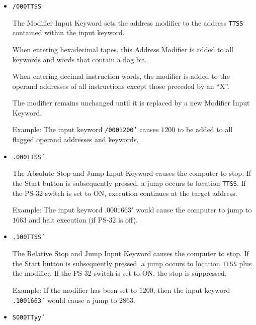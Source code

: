 \begin{itemize}
Example: The input keyword \texttt{V40C1100'} causes the following 64 (40 hex) hexadecimal words to be stored, beginning in memory location $1700$.

When reading hexadecimal tapes with \texttt{V} or \texttt{M} keywords, the Program Input Routine verifies each stored word; specifically, after a word is stored, the value in memory is compared with the read-in value. If the two values do not match, an error stop occurs.


\item \texttt{/000TTSS}

The Modifier Input Keyword sets the address modifier to the address \texttt{TTSS} contained within the input keyword.

When entering hexadecimal tapes, this Address Modifier is added to all keywords and words that contain a flag bit.

When entering decimal instruction words, the modifier is added to the operand addresses of all instructions except those preceded by an ``X''.

The modifier remains unchanged until it is replaced by a new Modifier Input Keyword.

Example: The input keyword \texttt{/0001200'} causes $1200$ to be added to all flagged operand addresses and keywords.

\item \texttt{.000TTSS'}

  The Absolute Stop and Jump Input Keyword causes the computer to stop. If the Start button is subsequently pressed, a jump occurs to location \texttt{TTSS}. If the \textsf{PS-32} switch is set to \textsf{ON}, execution continues at the target address.

    Example: The input keyword $.0001663'$ would cause the computer to jump to $1663$ and halt execution (if \textsf{PS-32} is off).

\item \texttt{.100TTSS'}

  The Relative Stop and Jump Input Keyword causes the computer to stop. If the Start button is subsequently pressed, a jump occurs to location \texttt{TTSS} plus the modifier. If the \textsf{PS-32} switch is set to \textsf{ON}, the stop is suppressed.

Example: If the modifier has been set to $1200$, then the input keyword \texttt{.1001663'} would cause a jump to $2863$.

\item \texttt{S000TTyy'}


\end{itemize}
